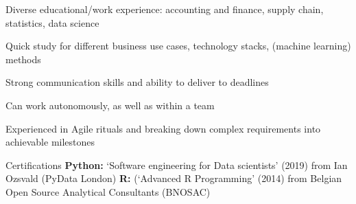 \begin{cvskills}
{\begin{cvitems}
            \item Diverse educational/work experience: accounting and finance, supply chain, statistics, data science
            \item Quick study for different business use cases, technology stacks, (machine learning) methods
            \item Strong communication skills and ability to deliver to deadlines
            \item Can work autonomously, as well as within a team
            \item Experienced in Agile rituals and breaking down complex requirements into achievable milestones            
        \end{cvitems}
        }
    \cvskill
        {Certifications \hfill}
        {
        \textbf{Python:} ‘Software engineering for Data scientists’ (2019) from Ian Ozsvald (PyData London) \newline
        \textbf{R:} (‘Advanced R Programming’ (2014) from Belgian Open Source Analytical Consultants (BNOSAC) 
        }
\end{cvskills}

